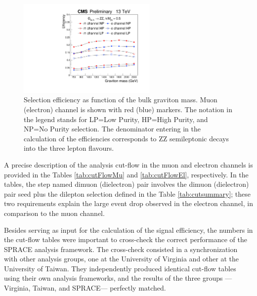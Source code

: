 \clearpage
\begin{figure}[hbt!!]
\begin{center}
\includegraphics[width=0.60\textwidth]{figures/objects/signalEfficiency.pdf}
\caption[Selection efficiency]{Selection efficiency as function of the bulk graviton mass. Muon (electron) channel is shown with red (blue) markers. The notation in the legend stands for LP=Low Purity, HP=High Purity, and NP=No Purity selection. The denominator entering in the calculation of the efficiencies corresponds to ZZ semileptonic decays into the three lepton flavours.}
\label{selectionEff_VZ}
\end{center}
\end{figure}

A precise description of the analysis cut-flow in the muon and electron channels is provided in the Tables \ref{tab:cutFlowMu} and \ref{tab:cutFlowEl}, respectively. In the tables, the step named dimuon (dielectron) pair involves the dimuon (dielectron) pair seed plus the dilepton selection defined in the Table \ref{tab:cutsummary}; these two requirements explain the large event drop observed in the electron channel, in comparison to the muon channel.

Besides serving as input for the calculation of the signal efficiency, the numbers in the cut-flow tables were important to cross-check the correct performance of the SPRACE analysis framework. The cross-check consisted in a synchronization with other analysis groups, one at the University of Virginia and other at the University of Taiwan. They independently produced identical cut-flow tables using their own analysis frameworks, and the results of the three groups ---Virginia, Taiwan, and SPRACE--- perfectly matched. 

